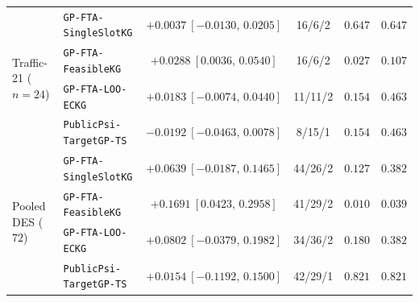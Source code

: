\begin{table}[htbp]
\begin{tabular}{llcccc}
\midrule
\multirow{4}{*}{Traffic-21 ($n=24$)} & \texttt{GP-FTA-SingleSlotKG} & $+0.0037\ [-0.0130,\,0.0205]$ & 16/6/2 & $0.647$ & $0.647$ \\
 & \texttt{GP-FTA-FeasibleKG} & $+0.0288\ [0.0036,\,0.0540]$ & 16/6/2 & $0.027$ & $0.107$ \\
 & \texttt{GP-FTA-LOO-ECKG} & $+0.0183\ [-0.0074,\,0.0440]$ & 11/11/2 & $0.154$ & $0.463$ \\
 & \texttt{PublicPsi-TargetGP-TS} & $-0.0192\ [-0.0463,\,0.0078]$ & 8/15/1 & $0.154$ & $0.463$ \\
\midrule
\multirow{4}{*}{Pooled DES ($72$)} & \texttt{GP-FTA-SingleSlotKG} & $+0.0639\ [-0.0187,\,0.1465]$ & 44/26/2 & $0.127$ & $0.382$ \\
 & \texttt{GP-FTA-FeasibleKG} & $+0.1691\ [0.0423,\,0.2958]$ & 41/29/2 & $0.010$ & $0.039$ \\
 & \texttt{GP-FTA-LOO-ECKG} & $+0.0802\ [-0.0379,\,0.1982]$ & 34/36/2 & $0.180$ & $0.382$ \\
 & \texttt{PublicPsi-TargetGP-TS} & $+0.0154\ [-0.1192,\,0.1500]$ & 42/29/1 & $0.821$ & $0.821$ \\
\bottomrule
\end{tabular}
\end{table}
